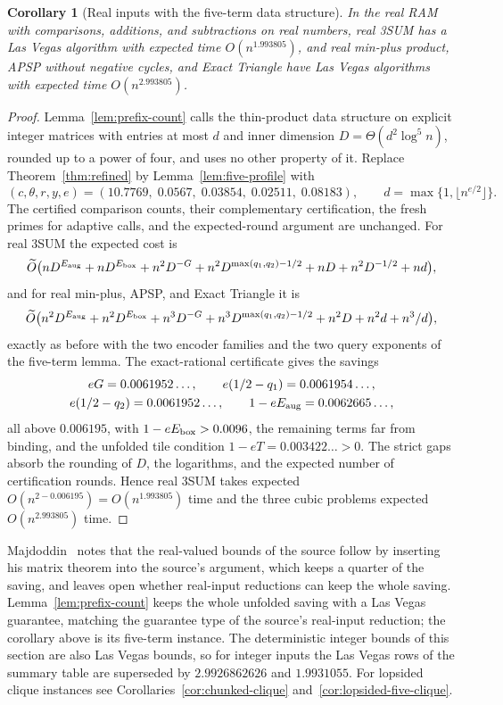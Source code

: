 \documentclass[11pt]{article}
\newtheorem{corollary}[theorem]{Corollary}
\newcommand{\softO}{\widetilde O}
\begin{document}
\begin{corollary}[Real inputs with the five-term data structure]
\label{cor:five-real}
In the real RAM with comparisons, additions, and subtractions on real
numbers, real 3SUM has a Las Vegas algorithm with expected time
$O(n^{1.993805})$, and real min-plus product, APSP without negative
cycles, and Exact Triangle have Las Vegas algorithms with expected time
$O(n^{2.993805})$.
\end{corollary}
\begin{proof}
Lemma~\ref{lem:prefix-count} calls the thin-product data structure on
explicit integer matrices with entries at most $d$ and inner dimension
$D=\Theta(d^2\log^5n)$, rounded up to a power of four, and uses no other
property of it. Replace Theorem~\ref{thm:refined} by
Lemma~\ref{lem:five-profile} with
\[
(c,\theta,r,y,e)=(10.7769,\;0.0567,\;0.03854,\;0.02511,\;0.08183),
\qquad d=\max\{1,\lfloor n^{e/2}\rfloor\}.
\]
The certified comparison counts, their complementary certification, the
fresh primes for adaptive calls, and the expected-round argument are
unchanged. For real 3SUM the expected cost is
\[
\softO\bigl(nD^{E_{\rm aug}}+nD^{E_{\rm box}}+n^2D^{-G}
+n^2D^{\max(q_1,q_2)-1/2}+nD+n^2D^{-1/2}+nd\bigr),
\]
and for real min-plus, APSP, and Exact Triangle it is
\[
\softO\bigl(n^2D^{E_{\rm aug}}+n^2D^{E_{\rm box}}+n^3D^{-G}
+n^3D^{\max(q_1,q_2)-1/2}+n^2D+n^2d+n^3/d\bigr),
\]
exactly as before with the two encoder families and the two query
exponents of the five-term lemma. The exact-rational certificate gives
the savings
\[
\begin{gathered}
eG=0.0061952\ldots,\qquad e(1/2-q_1)=0.0061954\ldots,\\
e(1/2-q_2)=0.0061952\ldots,\qquad 1-eE_{\rm aug}=0.0062665\ldots,
\end{gathered}
\]
all above $0.006195$, with $1-eE_{\rm box}>0.0096$, the remaining terms
far from binding, and the unfolded tile condition
$1-eT=0.003422\ldots>0$. The strict gaps absorb the rounding of $D$, the
logarithms, and the expected number of certification rounds. Hence real
3SUM takes expected $O(n^{2-0.006195})=O(n^{1.993805})$ time and the three
cubic problems expected $O(n^{2.993805})$ time.
\end{proof}
Majdoddin~\cite{M26} notes that the real-valued bounds of the source
follow by inserting his matrix theorem into the source's argument, which
keeps a quarter of the saving, and leaves open whether real-input
reductions can keep the whole saving. Lemma~\ref{lem:prefix-count} keeps
the whole unfolded saving with a Las Vegas guarantee, matching the guarantee
type of the source's real-input reduction; the corollary above is its
five-term instance. The deterministic integer bounds
of this section are also Las Vegas bounds, so for integer inputs the
Las Vegas rows of the summary table are superseded by $2.9926862626$ and
$1.9931055$. For lopsided clique instances see
Corollaries~\ref{cor:chunked-clique} and~\ref{cor:lopsided-five-clique}.
\end{document}
